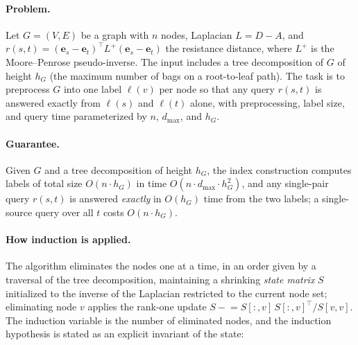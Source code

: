 \paragraph{Problem.}
Let $G = (V,E)$ be a graph with $n$ nodes, Laplacian $L = D - A$, and
$r(s,t) = (\mathbf{e}_s - \mathbf{e}_t)^{\!\top} L^{+} (\mathbf{e}_s - \mathbf{e}_t)$
the resistance distance, where $L^{+}$ is the Moore--Penrose pseudo-inverse. The input
includes a tree decomposition of $G$ of height $h_G$ (the maximum number of bags on a
root-to-leaf path). The task is to preprocess $G$ into one label $\ell(v)$ per node so
that any query $r(s,t)$ is answered exactly from $\ell(s)$ and $\ell(t)$ alone, with
preprocessing, label size, and query time parameterized by $n$, $d_{\max}$, and $h_G$.

\paragraph{Guarantee.}

\begin{theorem}\label{thm:ind-resistance}
Given $G$ and a tree decomposition of height $h_G$, the index construction computes
labels of total size $O(n \cdot h_G)$ in time $O(n \cdot d_{\max} \cdot h_G^{2})$, and
any single-pair query $r(s,t)$ is answered \emph{exactly} in $O(h_G)$ time from the two
labels; a single-source query over all $t$ costs $O(n \cdot h_G)$. \eop
\end{theorem}


\paragraph{How induction is applied.}
The algorithm eliminates the nodes one at a time, in an order given by a traversal of
the tree decomposition, maintaining a shrinking \emph{state matrix} $S$ initialized to
the inverse of the Laplacian restricted to the current node set; eliminating node $v$
applies the rank-one update $S \mathrel{-}= S[:,v]\,S[:,v]^{\!\top} / S[v,v]$. The
induction variable is the number of eliminated nodes, and the induction hypothesis is
stated as an explicit invariant of the state:

